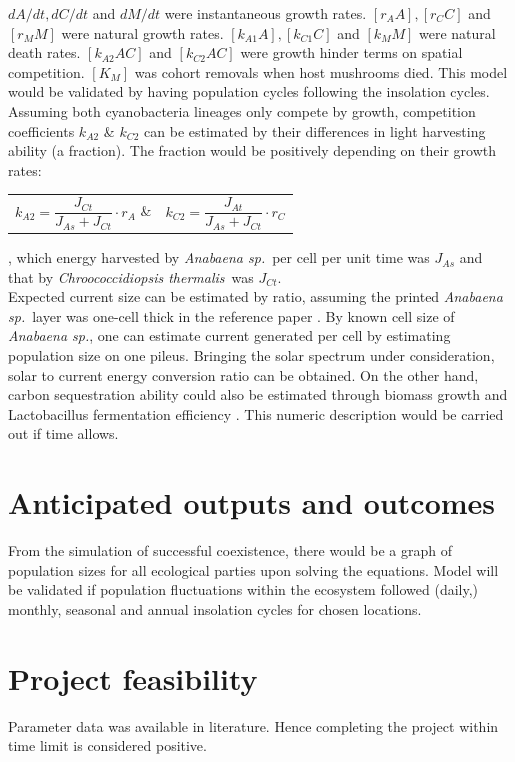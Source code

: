\documentclass[a4paper, 11pt]{article}
\newcommand{\As}{\textit{Anabaena sp.}}
\newcommand{\Ct}{\textit{Chroococcidiopsis thermalis}}
\begin{document}
$dA/dt, dC/dt$ and $dM/dt$ were instantaneous growth rates.  $[r_A A], [r_C C]$ and $[r_M M]$ were natural growth rates.  $[k_{A1} A], [k_{C1} C]$ and $[k_M M]$ were natural death rates.  $[k_{A2} A C]$ and $[k_{C2} A C]$ were growth hinder terms on spatial competition.  $[K_M]$ was cohort removals when host mushrooms died.  This model would be validated by having population cycles following the insolation cycles.\\

Assuming both cyanobacteria lineages only compete by growth, competition coefficients $k_{A2}$ \& $k_{C2}$ can be estimated by their differences in light harvesting ability (a fraction).  The fraction would be positively depending on their growth rates:
\begin{tabular}{cc}
	$k_{A2} = \dfrac{J_{Ct}}{J_{As} + J_{Ct}}\cdot r_A$ \&& $k_{C2} = \dfrac{J_{At}}{J_{As} + J_{Ct}}\cdot r_C$
\end{tabular}, which energy harvested by \As\ per cell per unit time was $J_{As}$ and that by \Ct\ was $J_{Ct}$.\\
Expected current size can be estimated by ratio, assuming the printed \As\ layer was one-cell thick in the reference paper \autocite{joshi2018bacterial}.  By known cell size of \As, one can estimate current generated per cell by estimating population size on one pileus.  Bringing the solar spectrum under consideration, solar to current energy conversion ratio can be obtained.  On the other hand, carbon sequestration ability could also be estimated through biomass growth \autocite{markou2014microalgal} and Lactobacillus fermentation efficiency \autocite{senthuran1997lactic}.  This numeric description would be carried out if time allows.

\section{Anticipated outputs and outcomes}
From the simulation of successful coexistence, there would be a graph of population sizes for all ecological parties upon solving the equations.  Model will be validated if population fluctuations within the ecosystem followed (daily,) monthly, seasonal and annual insolation cycles for chosen locations.

\section{Project feasibility}
Parameter data was available in literature.  Hence completing the project within time limit is considered positive.
\end{document}

